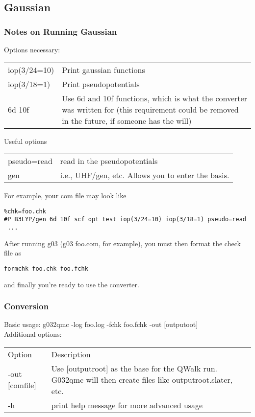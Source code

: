 \documentclass[12pt]{article}
\begin{document}
\subsection{Gaussian}
\subsubsection{Notes on Running Gaussian}

Options necessary: \\
\begin{tabular}{lp{8cm}}
iop(3/24=10) & Print gaussian functions \\
iop(3/18=1) & Print pseudopotentials \\
6d 10f & Use 6d and 10f functions, which is what the converter was written for (this requirement could be removed in the future, if someone has the will) \\
\end{tabular}

Useful options \\
\begin{tabular}{lp{8cm}}
pseudo=read & read in the pseudopotentials \\
gen & i.e., UHF/gen, etc. Allows you to enter the basis. \\
\end{tabular}

For example, your com file may look like \\
\begin{verbatim}
%chk=foo.chk
#P B3LYP/gen 6d 10f scf opt test iop(3/24=10) iop(3/18=1) pseudo=read
 ...
\end{verbatim}
After running g03 (g03 foo.com, for example), you must then format the
check file as \\
\begin{verbatim}
formchk foo.chk foo.fchk
\end{verbatim}
and finally you're ready to use the converter.

\subsubsection{Conversion}
Basic usage: g032qmc -log foo.log -fchk foo.fchk -out [outputoot]  \\
Additional options: \\
\begin{tabular}{lp{8cm}}
Option & Description \\
-out [comfile] & Use [outputroot] as the base for the QWalk run.
G032qmc will then create files like outputroot.slater, etc. \\
-h & print help message for more advanced usage\\
\end{tabular}
\end{document}

